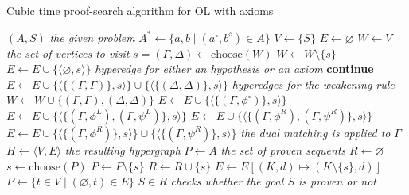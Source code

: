 \documentclass[a4paper, 11pt]{article}
\begin{document}
    \begin{algorithm}
	    \caption{Cubic time proof-search algorithm for OL with axioms}
	    \label{proof_search_algo}
    \begin{algorithmic}
	    \State $(A,S)$ \textit{the given problem}
	    \State $A^*\gets\{a,b\mid(a^\circ,b^\diamond)\in A\}$
	    \State $V\gets \{S\}$	
	    \State $E\gets\varnothing$
	    \State $W\gets V$ \textit{the set of vertices to visit}   
	    \State $s=(\Gamma,\Delta)\gets\text{choose}(W)$
	    \State $W\gets W\setminus\{s\}$
	    \State $E\gets E\cup\{\langle\varnothing,s\rangle\}$ 
	    \textit{hyperedge for either an hypothesis or an axiom}
	    \State\textbf{continue}
	    \EndIf
	    \State $E\gets E\cup\{\langle\{(\Gamma,\Gamma)\},s\rangle\}\cup
	    \{\langle\{(\Delta,\Delta)\},s\rangle\}$ \textit{hyperedges for the weakening rule}
	    \State $W\gets W\cup\{(\Gamma,\Gamma),(\Delta,\Delta)\}$
	    \If {$\Delta=\neg\phi^\circ$}
	    \State $E\gets E\cup\{\langle\{(\Gamma,\phi^\circ)\},s\rangle\}$
	    \State $E\gets E\cup\{\langle\{(\Gamma,\phi^L),(\Gamma,\psi^L)\},s\rangle\}$
	    \State $E\gets E\cup\{\langle\{(\Gamma,\phi^R),(\Gamma,\psi^R)\},s\rangle\}$
	    \State $E\gets E\cup\{\langle\{(\Gamma,\phi^R)\},s\rangle\}\cup
	    \{\langle\{(\Gamma,\psi^R)\},s\rangle\}$
	    \EndIf
	    \State \textit{the dual matching is applied to }$\Gamma$ 
	    \EndWhile
	    \State $H\gets\langle V,E\rangle$ \textit{the resulting hypergraph}
	    \State $P\gets A$ \textit{the set of proven sequents}
	    \State $R\gets \varnothing$
	    \State $s\gets \text{choose}(P)$
	    \State $P\gets P\setminus\{s\}$
	    \State $R\gets R\cup\{s\}$
	    \State $E\gets E[(K,d)\mapsto (K\setminus\{s\},d)]$
	    \State $P\gets \{t\in V\mid(\varnothing,t)\in E\}$  
	    \EndWhile
	    \State \Return $S\in R$ \textit{checks whether the goal $S$ is proven or not}
    \end{algorithmic}
    \end{algorithm}
\end{document}
